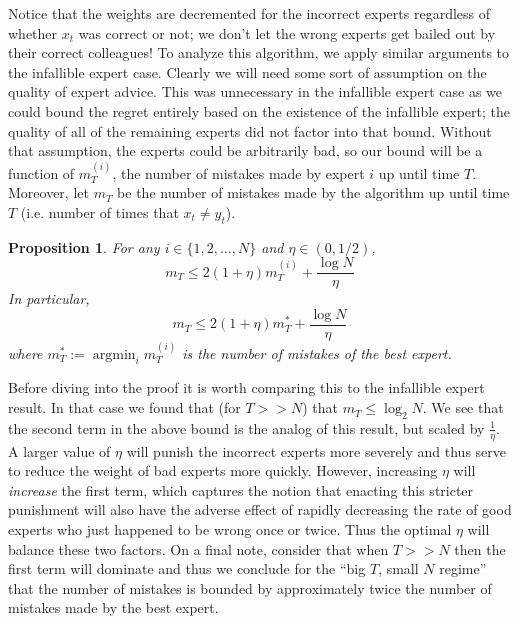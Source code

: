 \documentclass[12pt]{article}
\DeclareMathOperator*{\argmin}{argmin}
\newtheorem{prop}{Proposition}
\begin{document}
\bigskip

Notice that the weights are decremented for the incorrect experts regardless of whether $x_t$ was correct or not; we don't let the wrong experts get bailed out by their correct colleagues!
To analyze this algorithm, we apply similar arguments to the infallible expert case. Clearly we will need some sort of assumption on the quality of expert advice. This was unnecessary in the infallible expert
case as we could bound the regret entirely based on the existence of the infallible expert; the quality of all of the remaining experts did not factor into that bound. Without that assumption, the experts could 
be arbitrarily bad, so our bound will be a function of $m_T^{(i)}$, the number of mistakes made by expert $i$ up until time $T$. Moreover, let $m_T$ be the number of mistakes made by the algorithm up until
time $T$ (i.e. number of times that $x_t \neq y_t$). 

\begin{prop}
For any $i \in \{1, 2, \dots, N\}$ and $\eta \in (0, 1/2)$, 
\[m_T \leq 2(1 + \eta)m_T^{(i)} + \frac{\log N}{\eta}\]
In particular, 
\[m_T \leq 2(1 + \eta)m_T^{*} + \frac{\log N}{\eta}\]
where $m_T^{*} := \argmin_{i} m_T^{(i)}$ is the number of mistakes of the best expert. 
\end{prop}
Before diving into the proof it is worth comparing this to the infallible expert result. In that case we found that (for $T >> N$) that $m_T \leq \log_2 N$. We see that the second term in the above 
bound is the analog of this result, but scaled by $\frac{1}{\eta}$. A larger value of $\eta$ will punish the incorrect experts more severely and thus serve to reduce the weight of bad experts
more quickly. However, increasing $\eta$ will \textit{increase} the first term, which captures the notion that enacting this stricter punishment will also have the adverse effect of rapidly decreasing the 
rate of good experts who just happened to be wrong once or twice. Thus the optimal $\eta$ will balance these two factors. On a final note, consider that when $T >> N$ then the first term will 
dominate and thus we conclude for the ``big $T$, small $N$ regime'' that the number of mistakes is bounded by approximately twice the number of mistakes made by the best expert. 
\end{document}
